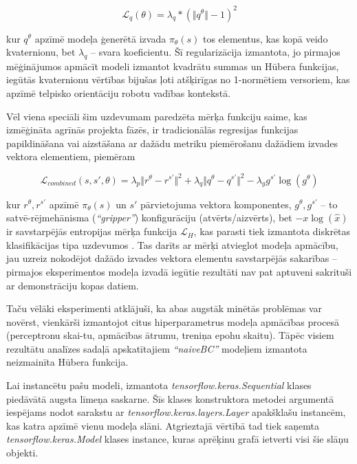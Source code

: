 \documentclass[12pt, a4paper]{article}
\numberwithin{equation}{section} %
\begin{document}
\begin{equation}
    \mathcal{L}_{q}(\theta) = \lambda_{q} * (\Vert q^{\theta} \Vert - 1)^2
\end{equation}

kur $q^{\theta}$ apzīmē modeļa ģenerētā izvada $\pi_{\theta}(s)$ tos elementus, kas kopā veido kvaternionu, bet $\lambda_q$ -- svara koeficientu. Šī regularizācija izmantota, jo pirmajos mēģinājumos apmācīt modeli izmantot kvadrātu summas un Hūbera funkcijas, iegūtās kvaternionu vērtības bijušas ļoti atšķirīgas no 1-normētiem versoriem, kas apzīmē telpisko orientāciju robotu vadības kontekstā. 

Vēl viena speciāli šim uzdevumam paredzēta mērķa funkciju saime, kas izmēģināta agrīnās projekta fāzēs, ir tradicionālās regresijas funkcijas papildināšana vai aizstāšana ar dažādu metriku piemērošanu dažādiem izvades vektora elementiem, piemēram

\begin{equation}
    \mathcal{L}_{combined}(s,s',\theta) = \lambda_p \Vert r^{\theta} - r^{s'}\Vert^2 + 
    \lambda_q \Vert q^{\theta} - q^{s'}\Vert^2 - 
    \lambda_g  g^{s'} \log(g^{\theta})
\end{equation}

kur $r^{\theta}, r^{s'}$ apzīmē $\pi_{\theta}(s)$ un $s'$ pārvietojuma vektora komponentes, $g^{\theta}, g^{s'}$  -- to satvē-rējmehānisma (\textit{``gripper''}) konfigurāciju (atvērts/aizvērts), bet $-x\log(\hat{x})$ ir savstarpējās entropijas mērķa funkcija $\mathcal{L}_H$, kas parasti tiek izmantota diskrētas klasifikācijas tipa uzdevumos \cite{keras_crossentropy}. Tas darīts ar mērķi atvieglot modeļa apmācību, jau uzreiz nokodējot dažādo izvades vektora elementu savstarpējās sakarības -- pirmajos eksperimentos modeļa izvadā iegūtie rezultāti nav pat aptuveni sakrituši ar demonstrāciju kopas datiem.

Taču vēlāki eksperimenti atklājuši, ka abas augstāk minētās problēmas var novērst, vienkārši izmantojot citus hiperparametrus modeļa apmācības procesā (perceptronu skai-tu, apmācības ātrumu, treniņa epohu skaitu). Tāpēc visiem rezultātu analīzes sadaļā apskatītajiem \textit{``naiveBC''} modeļiem izmantota neizmainīta Hūbera funkcija.

Lai instancētu pašu modeli, izmantota \textit{tensorflow.keras.Sequential} klases piedāvātā augsta līmeņa saskarne. Šīs klases konstruktora metodei argumentā iespējams nodot sarakstu ar \textit{tensorflow.keras.layers.Layer} apakšklašu instancēm, kas katra apzīmē vienu modeļa slāni. Atgrieztajā vērtībā tad tiek saņemta \textit{tensorflow.keras.Model} klases instance, kuras aprēķinu grafā ietverti visi šie slāņu objekti.
\end{document}

